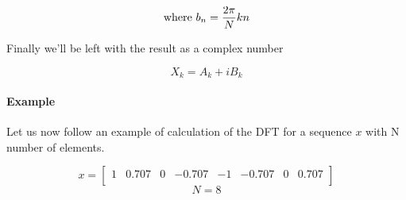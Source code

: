 \documentclass[
  oneside,
  11pt, a4paper,
  footinclude=true,
  headinclude=true,
  cleardoublepage=empty
]{scrbook}
\begin{document}
\begin{equation*}
    \text{where } \\ b_{n} = \frac{ 2 \pi}{N}kn \\
\end{equation*}


Finally we'll be left with the result as a complex number

\begin{equation*}
    X_{k} = A_{k} + i B_{k}
\end{equation*}


\paragraph{Example} \label{example1} Let us now follow an example of calculation of the DFT for a sequence \(x\) with N number of elements.

\pagestyle{empty}

\begin{equation*}
    x = 
    \begin{bmatrix}
        1 & 0.707 & 0 & -0.707 & -1 & -0.707 & 0 & 0.707\\
    \end{bmatrix}
\end{equation*}
\begin{equation*}
    N = 8
\end{equation*}
\end{document}
